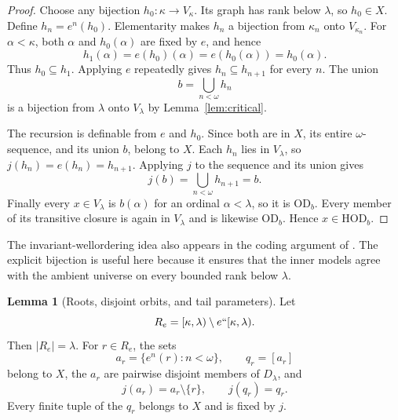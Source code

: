 \documentclass[11pt,letterpaper]{article}
\theoremstyle{definition}
\newtheorem{lemma}[definition]{Lemma}
\numberwithin{equation}{section}
\newcommand{\HOD}{\mathrm{HOD}}
\newcommand{\OD}{\mathrm{OD}}
\begin{document}
\begin{proof}
Choose any bijection $h_0:\kappa\to V_\kappa$. Its graph has rank below $\lambda$, so $h_0\in X$. Define $h_n=e^n(h_0)$. Elementarity makes $h_n$ a bijection from $\kappa_n$ onto $V_{\kappa_n}$. For $\alpha<\kappa$, both $\alpha$ and $h_0(\alpha)$ are fixed by $e$, and hence
\[
h_1(\alpha)=e(h_0)(\alpha)=e(h_0(\alpha))=h_0(\alpha).
\]
Thus $h_0\subseteq h_1$. Applying $e$ repeatedly gives $h_n\subseteq h_{n+1}$ for every $n$. The union
\[
b=\bigcup_{n<\omega}h_n
\]
is a bijection from $\lambda$ onto $V_\lambda$ by Lemma~\ref{lem:critical}.

The recursion is definable from $e$ and $h_0$. Since both are in $X$, its entire $\omega$-sequence, and its union $b$, belong to $X$. Each $h_n$ lies in $V_\lambda$, so $j(h_n)=e(h_n)=h_{n+1}$. Applying $j$ to the sequence and its union gives
\[
j(b)=\bigcup_{n<\omega}h_{n+1}=b.
\]
Finally every $x\in V_\lambda$ is $b(\alpha)$ for an ordinal $\alpha<\lambda$, so it is $\OD_b$. Every member of its transitive closure is again in $V_\lambda$ and is likewise $\OD_b$. Hence $x\in\HOD_b$.
\end{proof}

The invariant-wellordering idea also appears in the coding argument of \cite[Proposition~3.9]{abgl}. The explicit bijection is useful here because it ensures that the inner models agree with the ambient universe on every bounded rank below $\lambda$.

\begin{lemma}[Roots, disjoint orbits, and tail parameters]\label{lem:roots}
Let
\[
R_e=[\kappa,\lambda)\setminus e``[\kappa,\lambda).
\]
Then $|R_e|=\lambda$. For $r\in R_e$, the sets
\[
a_r=\{e^n(r):n<\omega\},\qquad q_r=[a_r]
\]
belong to $X$, the $a_r$ are pairwise disjoint members of $D_\lambda$, and
\[
j(a_r)=a_r\setminus\{r\},\qquad j(q_r)=q_r.
\]
Every finite tuple of the $q_r$ belongs to $X$ and is fixed by $j$.
\end{lemma}
\end{document}
